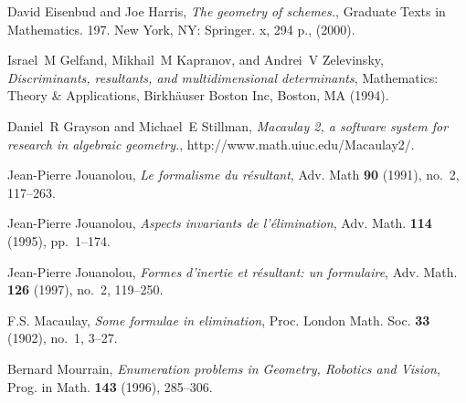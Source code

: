 \documentclass[10pt]{amsart}
\theoremstyle{plain}
\theoremstyle{definition}
\begin{document}
\begin{thebibliography}{BEM01}
David Eisenbud and Joe Harris, \emph{{The geometry of schemes.}}, {Graduate
  Texts in Mathematics. 197. New York, NY: Springer. x, 294 p.}, (2000).

Israel~M Gel{\cprime}fand, Mikhail~M Kapranov, and Andrei~V Zelevinsky,
  \emph{Discriminants, resultants, and multidimensional determinants},
  Mathematics: Theory \& Applications, Birkh{\"a}user Boston Inc, Boston, MA
  (1994).

Daniel~R Grayson and Michael~E Stillman, \emph{Macaulay 2, a software system
  for research in algebraic geometry.}, http://www.math.uiuc.edu/Macaulay2/.

Jean-Pierre Jouanolou, \emph{Le formalisme du r{\'e}sultant}, Adv. Math
  \textbf{90} (1991), no.~2, 117--263.

Jean-Pierre Jouanolou, \emph{Aspects invariants de l'{\'e}limination}, Adv.
  Math. \textbf{114} (1995),
  pp.~1--174.

Jean-Pierre Jouanolou, \emph{Formes d'inertie et r\'esultant: un formulaire}, Adv.
  Math. \textbf{126} (1997), no.~2, 119--250.
  
F.S. Macaulay, \emph{Some formulae in elimination}, Proc. London Math. Soc.
  \textbf{33} (1902), no.~1, 3--27.

Bernard Mourrain, \emph{Enumeration problems in {G}eometry, {R}obotics and
  {V}ision}, Prog. in Math. \textbf{143} (1996), 285--306.

\end{thebibliography}


\end{document}
